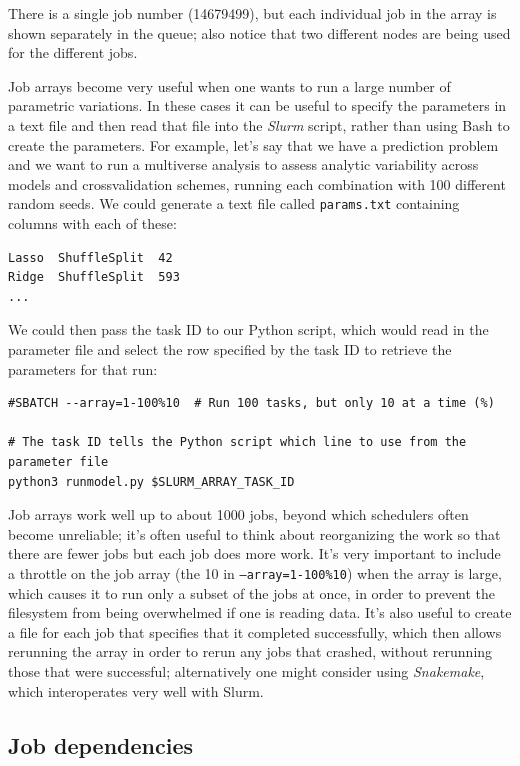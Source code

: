 There is a single job number (14679499), but each individual job in the array is shown separately in the queue; also notice that two different nodes are being used for the different jobs.

Job arrays become very useful when one wants to run a large number of parametric variations.  In these cases it can be useful to specify the parameters in a text file and then read that file into the \textit{Slurm} script, rather than using Bash to create the parameters. For example, let's say that we have a prediction problem and we want to run a multiverse analysis to assess analytic variability across models and crossvalidation schemes, running each combination with 100 different random seeds.  We could generate a text file called \texttt{params.txt} containing columns with each of these:

\begin{lstlisting}[style=shellshort]
Lasso  ShuffleSplit  42
Ridge  ShuffleSplit  593
...
\end{lstlisting}

We could then pass the task ID to our Python script, which would read in the parameter file and select the row specified by the task ID to retrieve the parameters for that run:

\begin{lstlisting}[style=shellshort]
#SBATCH --array=1-100%10  # Run 100 tasks, but only 10 at a time (%)

# The task ID tells the Python script which line to use from the parameter file
python3 runmodel.py $SLURM_ARRAY_TASK_ID
\end{lstlisting}

Job arrays work well up to about 1000 jobs, beyond which schedulers often become unreliable; it's often useful to think about reorganizing the work so that there are fewer jobs but each job does more work. It's very important to include a throttle on the job array (the 10 in \texttt{--array=1-100\%10}) when the array is large, which causes it to run only a subset of the jobs at once, in order to prevent the filesystem from being overwhelmed if one is reading data.  It's also useful to create a file for each job that specifies that it completed successfully, which then allows rerunning the array in order to rerun any jobs that crashed, without rerunning those that were successful; alternatively one might consider using \textit{Snakemake}, which interoperates very well with Slurm.

\subsection{Job dependencies}

